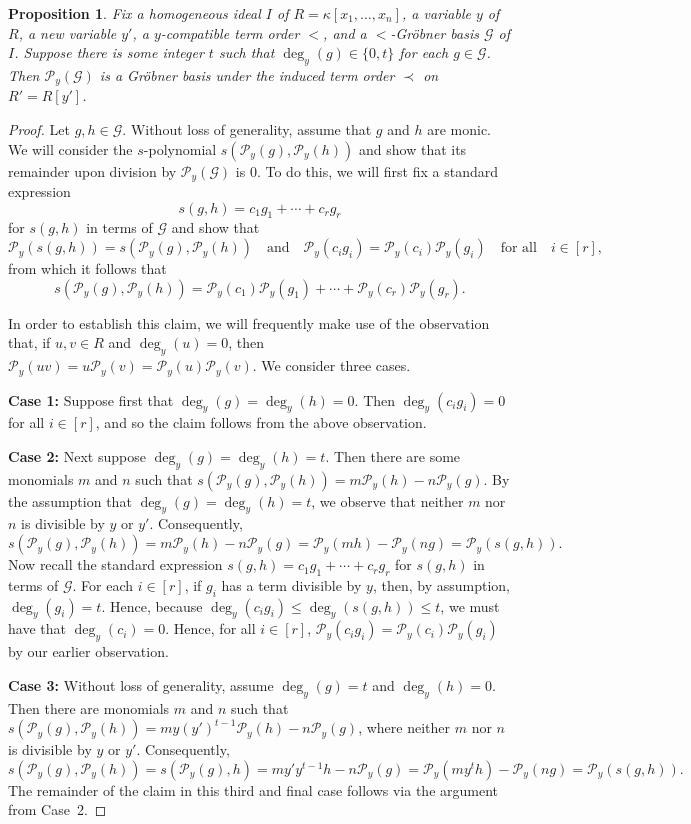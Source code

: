 \documentclass[12pt, reqno]{amsart}
\numberwithin{equation}{section}
\newtheorem{proposition}[theorem]{Proposition}
\newtheorem{Main Conjecture}[theorem]{Main Conjecture}
\theoremstyle{definition}
\theoremstyle{plain}
\newcommand{\G}{\mathcal{G}}
\renewcommand{\P}{\mathcal{P}}
\newcommand{\qand}{\quad \mbox{and} \quad}
\newcommand{\qforall}{\quad \mbox{for all} \quad}
\begin{document}
\begin{proposition}\label{prop:uniform-deg-in-y-polarizes}
Fix a homogeneous ideal $I$ of $R = \kappa[x_1, \ldots, x_n]$, a variable $y$ of $R$, a new variable $y'$, a $y$-compatible term order $<$, and a $<$-Gr\"obner basis $\G$ of $I$. Suppose there is some integer $t$ such that $\deg_y (g) \in \{0,t\}$ for each $g\in \G$. Then $\P_y (\G)$ is a Gr\"obner basis under the induced term order $\prec$ on $R' = R[y']$.
\end{proposition} 


\begin{proof}
Let $g,h\in \G$. Without loss of generality, assume that $g$ and $h$ are monic.  We will consider the $s$-polynomial $s(\P_y(g),\P_y(h))$ and show that its remainder upon division by $\P_y (\G)$ is $0$.  To do this, we will first fix a standard expression \[
s(g,h) = c_1g_1+\cdots+c_rg_r 
\] for $s(g,h)$ in terms of $\G$ and show that \[
\P_y(s(g, h)) = 
s(\P_y(g),\P_y(h)) 
\qand 
\P_y(c_i g_i) = 
\P_y(c_i)\P_y(g_i) \qforall i \in [r],
\] from which it follows that \[ s(\P_y(g),\P_y(h))=\P_y(c_1)\P_y(g_1)+\cdots+\P_y(c_r)\P_y(g_r).
\]

In order to establish this claim, we will frequently make use of the observation that, if $u, v \in R$ and $\deg_y(u)=0$, then $\P_y(uv) = u \P_y(v) = \P_y(u)\P_y(v)$.  We consider three cases.

\noindent \textbf{Case 1:} Suppose first that $\deg_y(g) = \deg_y(h) = 0$. Then $\deg_y(c_ig_i) = 0$ for all $i \in [r]$, and so the claim follows from the above observation.



\noindent \textbf{Case 2:} Next suppose $\deg_y(g) = \deg_y(h) = t$. 
Then there are some monomials $m$ and $n$ such that 
$s(\P_y(g),\P_y(h)) = m\P_y(h) - n\P_y(g)$. 
By the assumption that $\deg_y(g) = \deg_y(h) = t$, we observe that neither $m$ nor $n$ is divisible by $y$ or $y'$. 
Consequently, 
\[
    s(\P_y(g),\P_y(h)) = m\P_y(h) - n\P_y(g)
     = \P_y(mh) - \P_y(ng)   = \P_y(s(g,h)).
\]
Now recall the standard expression
$s(g,h) = c_1g_1+\cdots + c_rg_r$ for $s(g,h)$ in terms of $\G$.
For each $i \in [r]$, if $g_i$ has a term divisible by $y$, then, by assumption, $\deg_y(g_i) = t$. Hence, because $\deg_y(c_ig_i) \leq \deg_y (s(g,h))\leq t$, we must have that $\deg_y(c_i) = 0$. 
Hence, for all $i \in [r]$, $\P_y(c_ig_i) = \P_y(c_i)\P_y(g_i)$ by our earlier observation. 

\noindent \textbf{Case 3:} Without loss of generality, assume $\deg_y(g) = t$ and $\deg_y(h) = 0$.
    Then there are monomials $m$ and $n$ such that 
$s(\P_y(g),\P_y(h)) = my(y')^{t-1}\P_y(h) - n\P_y(g)$,
where neither $m$ nor $n$ is divisible by $y$ or $y'$. Consequently, 
\[
    s(\P_y(g),\P_y(h)) = s(\P_y(g),h)= my'y^{t-1}h - n\P_y(g)
     = \P_y(my^t h) - \P_y(ng)   = \P_y(s(g,h)).
\]
The remainder of the claim in this third and final case follows via the argument from Case~2.


\end{proof}
\end{document}
